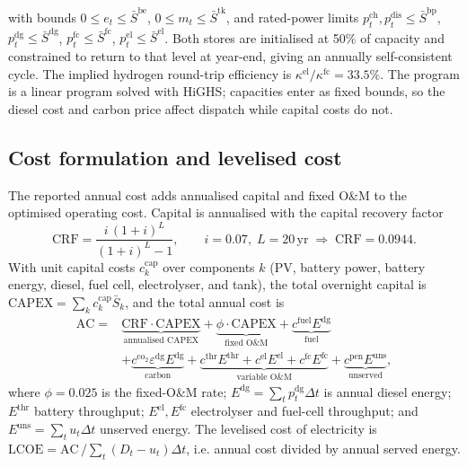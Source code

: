 \documentclass[preprint,12pt]{elsarticle}
\begin{document}
with bounds $0\le e_t\le\bar S^{\mathrm{be}}$, $0\le m_t\le\bar S^{\mathrm{tk}}$,
and rated-power limits $p^{\mathrm{ch}}_t,p^{\mathrm{dis}}_t\le\bar S^{\mathrm{bp}}$,
$p^{\mathrm{dg}}_t\le\bar S^{\mathrm{dg}}$, $p^{\mathrm{fc}}_t\le\bar S^{\mathrm{fc}}$,
$p^{\mathrm{el}}_t\le\bar S^{\mathrm{el}}$. Both stores are initialised at 50\% of
capacity and constrained to return to that level at year-end, giving an annually
self-consistent cycle. The implied hydrogen round-trip efficiency is
$\kappa^{\mathrm{el}}/\kappa^{\mathrm{fc}}=33.5\%$. The program is a linear program
solved with HiGHS; capacities enter as fixed bounds, so the diesel cost and carbon
price affect dispatch while capital costs do not.

\subsection{Cost formulation and levelised cost}
The reported annual cost adds annualised capital and fixed O\&M to the optimised
operating cost. Capital is annualised with the capital recovery factor
\begin{equation}
\label{eq:crf}
\mathrm{CRF} = \frac{i\,(1+i)^{L}}{(1+i)^{L}-1}, \qquad i=0.07,\; L=20\,\mathrm{yr} \;\Rightarrow\; \mathrm{CRF}=0.0944.
\end{equation}
With unit capital costs $c^{\mathrm{cap}}_k$ over components $k$ (PV, battery
power, battery energy, diesel, fuel cell, electrolyser, and tank), the total
overnight capital is $\mathrm{CAPEX}=\sum_k c^{\mathrm{cap}}_k \bar S_k$, and
the total annual cost is
\begin{equation}
\label{eq:ac}
\begin{aligned}
\mathrm{AC} = {} &
\underbrace{\mathrm{CRF}\cdot\mathrm{CAPEX}}_{\text{annualised CAPEX}}
+ \underbrace{\phi\cdot\mathrm{CAPEX}}_{\text{fixed O\&M}}
+ \underbrace{c^{\mathrm{fuel}}E^{\mathrm{dg}}}_{\text{fuel}} \\[2pt]
& + \underbrace{c^{\mathrm{co_2}}\varepsilon^{\mathrm{dg}} E^{\mathrm{dg}}}_{\text{carbon}}
+ \underbrace{c^{\mathrm{thr}}E^{\mathrm{thr}} + c^{\mathrm{el}}E^{\mathrm{el}} + c^{\mathrm{fc}}E^{\mathrm{fc}}}_{\text{variable O\&M}}
+ \underbrace{c^{\mathrm{pen}}E^{\mathrm{uns}}}_{\text{unserved}} ,
\end{aligned}
\end{equation}
where $\phi=0.025$ is the fixed-O\&M rate; $E^{\mathrm{dg}}=\sum_t
p^{\mathrm{dg}}_t\Delta t$ is annual diesel energy; $E^{\mathrm{thr}}$ battery
throughput; $E^{\mathrm{el}},E^{\mathrm{fc}}$ electrolyser and fuel-cell
throughput; and $E^{\mathrm{uns}}=\sum_t u_t\Delta t$ unserved energy. The
levelised cost of electricity is
$\mathrm{LCOE} = \mathrm{AC}\,/\!\sum_t (D_t-u_t)\Delta t$, i.e. annual cost
divided by annual served energy.
\end{document}
